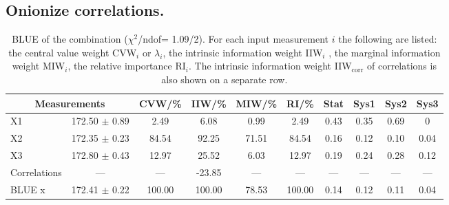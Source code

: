 \subsection{Onionize correlations.}
\begin{table}[H]
\scriptsize
\begin{center}
\renewcommand{\arraystretch}{1.1}
\begin{tabular}{|lc|c|c|c|c|cccc|}
\hline
\multicolumn{2}{|c|}{Measurements} & CVW/\%  & IIW/\%  & MIW/\%  & RI/\%  & {\tiny Stat} & {\tiny Sys1} & {\tiny Sys2} & {\tiny Sys3}\\
\hline
X1 &     172.50 $\pm$       0.89 &       2.49 &       6.08 &       0.99 &       2.49 &       0.43 &       0.35 &       0.69 &  0\\
X2 &     172.35 $\pm$       0.23 &      84.54 &      92.25 &      71.51 &      84.54 &       0.16 &       0.12 &       0.10 &       0.04\\
X3 &     172.80 $\pm$       0.43 &      12.97 &      25.52 &       6.03 &      12.97 &       0.19 &       0.24 &       0.28 &       0.12\\
Correlations & --- & --- &     -23.85 & --- & --- & --- & --- & --- & ---\\
\hline
BLUE {\tiny x} &     172.41 $\pm$       0.22 &     100.00 &     100.00 &      78.53 &     100.00 &       0.14 &       0.12 &       0.11 &       0.04\\
\hline
\end{tabular}
\caption{BLUE of the combination ($\chi^2$/ndof=      1.09/2).
 For each input measurement $i$ the following are listed: the central value weight CVW$_i$ or $\lambda_i$, the intrinsic information weight IIW$_i$ , the marginal information weight MIW$_i$, the relative importance RI$_i$. The intrinsic information weight IIW$_{\mathrm{corr}}$ of correlations is also shown on a separate row.}
\renewcommand{\arraystretch}{1}
\end{center}
\end{table}
